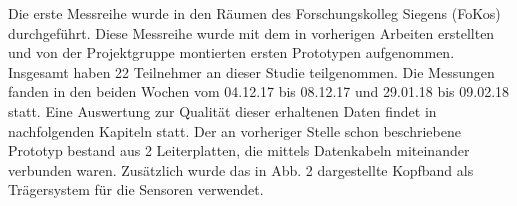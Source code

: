 

Die erste Messreihe wurde in den Räumen des Forschungskolleg Siegens (FoKos) durchgeführt. Diese Messreihe wurde mit dem in vorherigen Arbeiten erstellten und von der Projektgruppe montierten ersten Prototypen aufgenommen. Insgesamt haben 22 Teilnehmer an dieser Studie teilgenommen. Die Messungen fanden in den beiden Wochen vom 04.12.17 bis 08.12.17 und 29.01.18 bis 09.02.18 statt. Eine Auswertung zur Qualität dieser erhaltenen Daten findet in nachfolgenden Kapiteln statt. Der an vorheriger Stelle schon beschriebene Prototyp bestand aus 2 Leiterplatten, die mittels Datenkabeln miteinander verbunden waren. Zusätzlich wurde das in Abb. 2 dargestellte Kopfband als Trägersystem für die Sensoren verwendet.